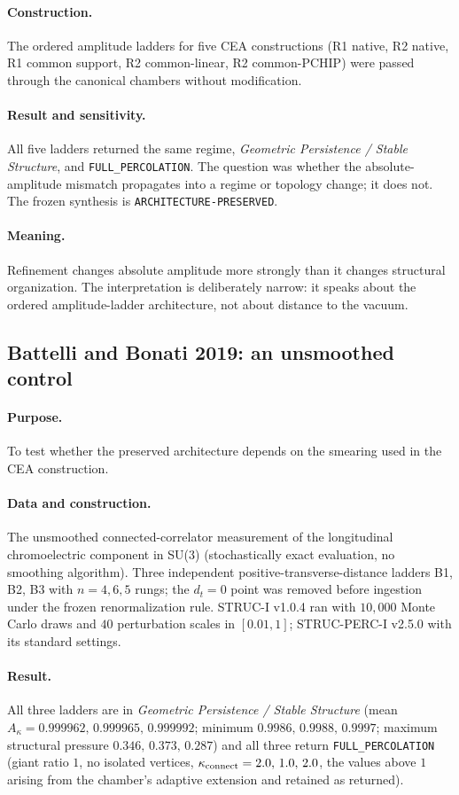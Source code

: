 \documentclass[11pt,a4paper]{article}
\theoremstyle{definition}
\theoremstyle{remark}
\begin{document}
\paragraph{Construction.} The ordered amplitude ladders for five CEA constructions (R1 native, R2 native, R1 common support, R2 common-linear, R2 common-PCHIP) were passed through the canonical chambers without modification.
\paragraph{Result and sensitivity.} All five ladders returned the same regime, \emph{Geometric Persistence / Stable Structure}, and \texttt{FULL\_PERCOLATION}. The question was whether the absolute-amplitude mismatch propagates into a regime or topology change; it does not. The frozen synthesis is \texttt{ARCHITECTURE-\allowbreak{}PRESERVED}.
\paragraph{Meaning.} Refinement changes absolute amplitude more strongly than it changes structural organization. The interpretation is deliberately narrow: it speaks about the ordered amplitude-ladder architecture, not about distance to the vacuum.

\subsection{Battelli and Bonati 2019: an unsmoothed control}\label{ssec:battelli}
\paragraph{Purpose.} To test whether the preserved architecture depends on the smearing used in the CEA construction.
\paragraph{Data and construction.} The unsmoothed connected-correlator measurement of the longitudinal chromoelectric component in SU(3) \cite{Battelli19} (stochastically exact evaluation, no smoothing algorithm). Three independent positive-transverse-distance ladders B1, B2, B3 with $n=4,6,5$ rungs; the $d_t=0$ point was removed before ingestion under the frozen renormalization rule. STRUC-I v1.0.4 ran with $10{,}000$ Monte Carlo draws and $40$ perturbation scales in $[0.01,1]$; STRUC-PERC-I v2.5.0 with its standard settings.
\paragraph{Result.} All three ladders are in \emph{Geometric Persistence / Stable Structure} (mean $A_\kappa=0.999962,\,0.999965,\,0.999992$; minimum $0.9986,\,0.9988,\,0.9997$; maximum structural pressure $0.346,\,0.373,\,0.287$) and all three return \texttt{FULL\_PERCOLATION} (giant ratio $1$, no isolated vertices, $\kappa_{\rm connect}=2.0,\,1.0,\,2.0$, the values above $1$ arising from the chamber's adaptive extension and retained as returned).
\end{document}
